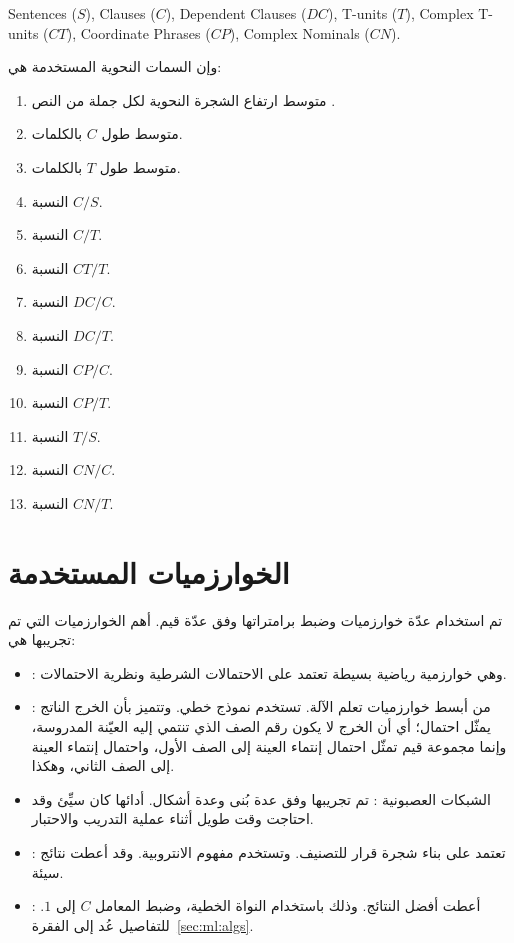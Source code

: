 \begin{english}
	Sentences ($S$), Clauses ($C$), Dependent Clauses ($DC$),
	T-units ($T$), Complex T-units ($CT$), Coordinate Phrases ($CP$),
	Complex Nominals ($CN$).
\end{english}

وإن السمات النحوية المستخدمة هي:
\begin{enumerate}[resume]
	\item
	متوسط ارتفاع الشجرة النحوية لكل جملة من النص .
	\item 
	متوسط طول $C$ بالكلمات.
	\item 
	متوسط طول $T$ بالكلمات.
	\item 
	النسبة $C/S$.
	\item 
	النسبة $C/T$.
	\item 
	النسبة $CT/T$.
	\item 
	النسبة $DC/C$.
	\item 
	النسبة $DC/T$.
	\item 
	النسبة $CP/C$.
	\item 
	النسبة $CP/T$.
	\item 
	النسبة $T/S$.
	\item 
	النسبة $CN/C$.
	\item 
	النسبة $CN/T$.
\end{enumerate}



\section{الخوارزميات المستخدمة}
تم استخدام عدّة خوارزميات وضبط برامتراتها وفق عدّة قيم.
أهم الخوارزميات التي تم تجريبها هي:
\begin{itemize}
	\item 
	 :
	 وهي خوارزمية رياضية بسيطة تعتمد على الاحتمالات الشرطية ونظرية الاحتمالات.
	 
	 \item 
	 :
	 من أبسط خوارزميات تعلم الآلة.
	 تستخدم نموذج خطي.
	 وتتميز بأن الخرج الناتج يمثّل احتمال؛
	 أي أن الخرج لا يكون رقم الصف الذي تنتمي إليه العيّنة المدروسة،
	 وإنما مجموعة قيم تمثّل احتمال إنتماء العينة إلى الصف الأول، واحتمال إنتماء العينة إلى الصف الثاني، وهكذا.
	 
	 \item 
	 الشبكات العصبونية :
	 تم تجريبها وفق عدة بُنى وعدة أشكال.
	 أدائها كان سيِّئ وقد احتاجت وقت طويل أثناء عملية التدريب والاحتبار.
	 \item 
	 
	 :
	تعتمد على بناء شجرة قرار للتصنيف. وتستخدم مفهوم الانتروبية. وقد أعطت نتائج سيئة.
	 
	 \item
	 :
	أعطت أفضل النتائج.
	وذلك باستخدام النواة الخطية، وضبط المعامل $C$ إلى $1$.
	للتفاصيل عُد إلى الفقرة~\ref{sec:ml:algs}.
\end{itemize}


